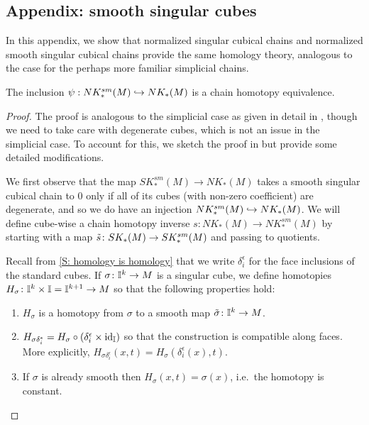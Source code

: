 \subsection{Appendix: smooth singular cubes}

In this appendix, we show that normalized singular cubical chains and normalized smooth singular cubical chains provide the same homology theory, analogous to the case for the perhaps more familiar simplicial chains.

\begin{proposition}\label{P: singular smooth cubes}
	The inclusion $\psi: NK^{sm}_*(M) \hookrightarrow NK_*(M)$ is a chain homotopy equivalence.
\end{proposition}

\begin{proof}
	The proof is analogous to the simplicial case as given in detail in \cite[Theorem 18.7]{Lee13}, though we need to take care with degenerate cubes, which is not an issue in the simplicial case.
	To account for this, we sketch the proof in \cite{Lee13} but provide some detailed modifications.

	We first observe that the map $SK^{sm}_*(M) \to NK_*(M)$ takes a smooth singular cubical chain to $0$ only if all of its cubes (with non-zero coefficient) are degenerate, and so we do have an injection $NK^{sm}_*(M) \hookrightarrow NK_*(M)$.
	We will define cube-wise a chain homotopy inverse $s \colon NK_*(M) \to NK^{sm}_*(M)$ by starting with a map $\tilde s \colon SK_*(M) \to SK^{sm}_*(M)$ and passing to quotients.

	Recall from \cref{S: homology is homology} that we write $\delta_i^\epsilon$ for the face inclusions of the standard cubes.
	If $\sigma \colon \mathbb{I}^k \to M$ is a singular cube, we define homotopies $H_\sigma \colon \mathbb{I}^k \times \mathbb{I} = \mathbb{I}^{k+1} \to M$ so that the following properties hold:
	\begin{enumerate}
		\item\label{I: smooth} $H_\sigma$ is a homotopy from $\sigma$ to a smooth map $\tilde \sigma \colon \mathbb{I}^k \to M$.

		\item\label{I: faces} $H_{\sigma \delta_i^\epsilon} = H_\sigma \circ (\delta_i^\epsilon \times \mathrm{id}_{\mathbb{I}})$ so that the construction is compatible along faces.
		More explicitly, $H_{\sigma \delta_i^\epsilon}(x,t) = H_\sigma(\delta_i^\epsilon(x),t)$.

		\item\label{I: already smooth} If $\sigma$ is already smooth then $H_{\sigma}(x,t) = \sigma(x)$, i.e.\ the homotopy is constant.


\end{enumerate}
\end{proof}
